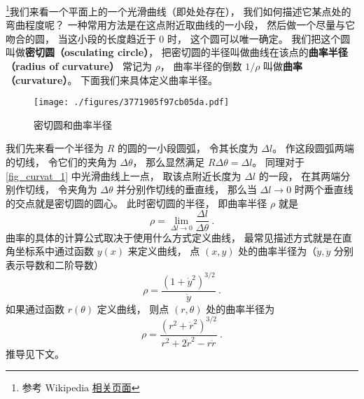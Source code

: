 

\footnote{参考 Wikipedia \href{https://en.wikipedia.org/wiki/Curvature}{相关页面}}我们来看一个平面上的一个光滑曲线（即处处存在）， 我们如何描述它某点处的弯曲程度呢？ 一种常用方法是在这点附近取曲线的一小段， 然后做一个尽量与它吻合的圆， 当这小段的长度趋近于 0 时， 这个圆可以唯一确定。 我们把这个圆叫做\textbf{密切圆（osculating circle）}， 把密切圆的半径叫做曲线在该点的\textbf{曲率半径（radius of curvature）} 常记为 $\rho$， 曲率半径的倒数 $1/\rho$ 叫做\textbf{曲率（curvature）}。 下面我们来具体定义曲率半径。
\begin{figure}[ht]
\centering
\texttt{[image: ./figures/3771905f97cb05da.pdf]}
\caption{密切圆和曲率半径} \label{fig_curvat_1}
\end{figure}

我们先来看一个半径为 $R$ 的圆的一小段圆弧， 令其长度为 $\Delta l$。 作这段圆弧两端的切线， 令它们的夹角为 $\Delta \theta$， 那么显然满足 $R \Delta\theta = \Delta l$。 同理对于\autoref{fig_curvat_1} 中光滑曲线上一点， 取该点附近长度为 $\Delta l$ 的一段， 在其两端分别作切线， 令夹角为 $\Delta\theta$ 并分别作切线的垂直线， 那么当 $\Delta l \to 0$ 时两个垂直线的交点就是密切圆的圆心。 此时密切圆的半径， 即曲率半径 $\rho$ 就是
\begin{equation}\label{eq_curvat_3}
\rho = \lim_{\Delta l \to 0} \frac{\Delta l}{\Delta \theta}~.
\end{equation}
曲率的具体的计算公式取决于使用什么方式定义曲线， 最常见描述方式就是在直角坐标系中通过函数 $y(x)$ 来定义曲线， 点 $(x, y)$ 处的曲率半径为（$\dot y, \ddot y$ 分别表示导数和二阶导数）
\begin{equation}
\rho = \frac{(1 + \dot y^2)^{3/2}}{\ddot y}~.
\end{equation}
如果通过函数 $r(\theta)$ 定义曲线， 则点 $(r, \theta)$ 处的曲率半径为
\begin{equation}
\rho = \frac{(r^2 + \dot r^2)^{3/2}}{r^2 + 2\dot r^2 - r\ddot r}~.
\end{equation}
推导见下文。

